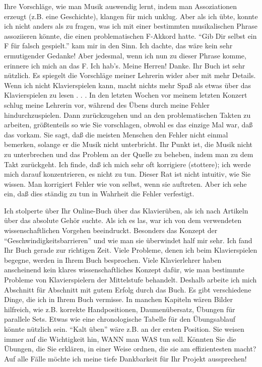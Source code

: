 \item \label{testimonials21}
Ihre Vorschläge, wie man Musik auswendig lernt, indem man Assoziationen erzeugt (z.B. eine Geschichte), klangen für mich unklug.
Aber als ich übte, konnte ich nicht anders als zu fragen, was ich mit einer bestimmten musikalischen Phrase assoziieren könnte, die einen problematischen F-Akkord hatte.
\enquote{Gib Dir selbst ein F für falsch gespielt.} kam mir in den Sinn.
Ich dachte, das wäre kein sehr ermutigender Gedanke!
Aber jedesmal, wenn ich nun zu dieser Phrase komme, erinnere ich mich an das F.
Ich hab's. Meine Herren! Danke. Ihr Buch ist sehr nützlich.
Es spiegelt die Vorschläge meiner Lehrerin wider aber mit mehr Details.
Wenn ich nicht Klavierspielen kann, macht nichts mehr Spaß als etwas über das Klavierspielen zu lesen . . .
In den letzten Wochen vor meinem letzten Konzert schlug meine Lehrerin vor, während des Übens durch meine Fehler hindurchzuspielen.
Dann zurückzugehen und an den problematischen Takten zu arbeiten, größtenteils so wie Sie vorschlagen, obwohl es das einzige Mal war, daß das vorkam.
Sie sagt, daß die meisten Menschen den Fehler nicht einmal bemerken, solange er die Musik nicht unterbricht.
Ihr Punkt ist, die Musik nicht zu unterbrechen und das Problem an der Quelle zu beheben, indem man zu dem Takt zurückgeht.
Ich finde, daß ich mich sehr oft korrigiere (stottere); ich werde mich darauf konzentrieren, es nicht zu tun.
Dieser Rat ist nicht intuitiv, wie Sie wissen.
Man korrigiert Fehler wie von selbst, wenn sie auftreten.
Aber ich sehe ein, daß dies ständig zu tun in Wahrheit die Fehler verfestigt.


\item \label{testimonials22}
Ich stolperte über Ihr Online-Buch über das Klavierüben, als ich nach Artikeln über das absolute Gehör suchte.
Als ich es las, war ich von dem verwendeten wissenschaftlichen Vorgehen beeindruckt.
Besonders das Konzept der \enquote{Geschwindigkeitsbarrieren} und wie man sie überwindet half mir sehr.
Ich fand Ihr Buch gerade zur richtigen Zeit.
Viele Probleme, denen ich beim Klavierspielen begegne, werden in Ihrem Buch besprochen.
Viele Klavierlehrer haben anscheinend kein klares wissenschaftliches Konzept dafür, wie man bestimmte Probleme von Klavierspielern der Mittelstufe behandelt.
Deshalb arbeite ich mich Abschnitt für Abschnitt mit gutem Erfolg durch das Buch.
Es gibt verschiedene Dinge, die ich in Ihrem Buch vermisse.
In manchen Kapiteln wären Bilder hilfreich, wie z.B. korrekte Handpositionen, Daumenübersatz, Übungen für parallele Sets.
Etwas wie eine chronologische Tabelle für den Übungsablauf könnte nützlich sein.
\enquote{Kalt üben} wäre z.B. an der ersten Position.
Sie weisen immer auf die Wichtigkeit hin, WANN man WAS tun soll.
Könnten Sie die Übungen, die Sie erklären, in einer Weise ordnen, die sie am effizientesten macht?
Auf alle Fälle möchte ich meine tiefe Dankbarkeit für Ihr Projekt aussprechen!


